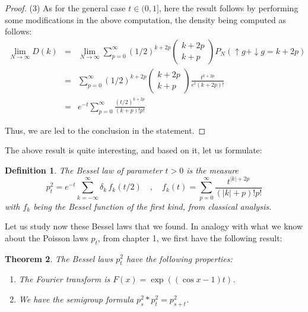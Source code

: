 \documentclass[12pt]{amsbook}
\newtheorem{theorem}{Theorem}[chapter]
\newtheorem{definition}[theorem]{Definition}
\begin{document}
\begin{proof}
(3) As for the general case $t\in(0,1]$, here the result follows by performing some modifications in the above computation, the density being computed as follows:
\begin{eqnarray*}
\lim_{N\to\infty}D(k)
&=&\lim_{N\to\infty}\sum_{p=0}^\infty(1/2)^{k+2p}\begin{pmatrix}k+2p\\ k+p\end{pmatrix} P_N(\uparrow g+\downarrow g=k+2p)\\
&=&\sum_{p=0}^\infty(1/2)^{k+2p}\begin{pmatrix}k+2p\\
k+p\end{pmatrix}\frac{t^{k+2p}}{e^t(k+2p)!}\\
&=&e^{-t}\sum_{p=0}^\infty \frac{(t/2)^{k+2p}}{(k+p)!p!}
\end{eqnarray*}

Thus, we are led to the conclusion in the statement.
\end{proof}

The above result is quite interesting, and based on it, let us formulate:


\begin{definition}
The Bessel law of parameter $t>0$ is the measure
$$p^2_t=e^{-t}\sum_{k=-\infty}^\infty\delta_k\,f_k(t/2)\quad,\quad 
f_k(t)=\sum_{p=0}^\infty \frac{t^{|k|+2p}}{(|k|+p)!p!}$$
with $f_k$ being the Bessel function of the first kind, from classical analysis.
\end{definition}

Let us study now these Bessel laws that we found. In analogy with what we know about the Poisson laws $p_t$, from chapter 1, we first have the following result:


\begin{theorem}
The Bessel laws $p^2_t$ have the following properties:
\begin{enumerate}
\item The Fourier transform is $F(x)=\exp((\cos x-1)t)$.

\item We have the semigroup formula $p^2_s*p^2_t=p^2_{s+t}$.
\end{enumerate}
\end{theorem}
\end{document}
